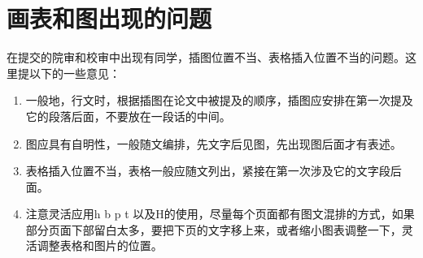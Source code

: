 









\section{画表和图出现的问题}
在提交的院审和校审中出现有同学，插图位置不当、表格插入位置不当的问题。这里提以下的一些意见：
\begin{enumerate}[label=(\arabic*)]
    \item 一般地，行文时，根据插图在论文中被提及的顺序，插图应安排在第一次提及它的段落后面，不要放在一段话的中间。
    \item 图应具有自明性，一般随文编排，先文字后见图，先出现图后面才有表述。
    \item 表格插入位置不当，表格一般应随文列出，紧接在第一次涉及它的文字段后面。
    \item 注意灵活应用h b p t 以及H的使用，尽量每个页面都有图文混排的方式，如果部分页面下部留白太多，要把下页的文字移上来，或者缩小图表调整一下，灵活调整表格和图片的位置。
\end{enumerate}
